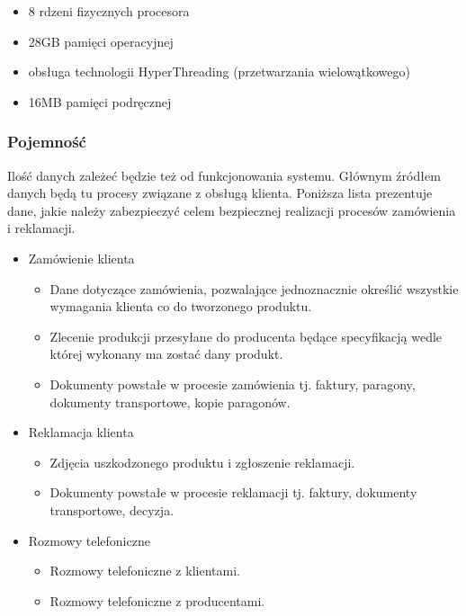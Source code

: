 					\begin{itemize}
						\item 8 rdzeni fizycznych procesora
						\item 28GB pamięci operacyjnej
						\item obsługa technologii HyperThreading (przetwarzania wielowątkowego)
						\item 16MB pamięci podręcznej
					\end{itemize}
					
			\subsubsection{Pojemność}
				\par Ilość danych zależeć będzie też od funkcjonowania systemu. Głównym źródłem danych będą tu procesy związane z obsługą klienta. Poniższa lista prezentuje dane, jakie należy zabezpieczyć celem bezpiecznej realizacji procesów zamówienia i reklamacji.
	
					\begin{itemize}
						\item Zamówienie klienta
							\begin{itemize}
								\item Dane dotyczące zamówienia, pozwalające jednoznacznie określić wszystkie wymagania klienta co do tworzonego produktu.
								\item Zlecenie produkcji przesyłane do producenta będące specyfikacją wedle której wykonany ma zostać dany produkt.
								\item Dokumenty powstałe w procesie zamówienia tj. faktury, paragony, dokumenty transportowe, kopie paragonów.
							\end{itemize}
						\item Reklamacja klienta
							\begin{itemize}
								\item Zdjęcia uszkodzonego produktu i zgłoszenie reklamacji.
								\item Dokumenty powstałe w procesie reklamacji tj. faktury, dokumenty transportowe, decyzja.
							\end{itemize}
						\item Rozmowy telefoniczne
							\begin{itemize}
								\item Rozmowy telefoniczne z klientami.
								\item Rozmowy telefoniczne z producentami.
							\end{itemize}
					\end{itemize}
		
